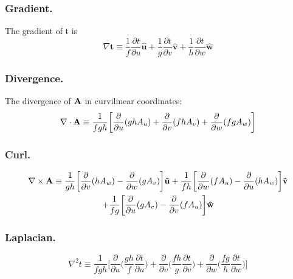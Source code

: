 \documentclass[../main.tex]{subfiles}
\begin{document}
\subsubsection{Gradient.} The gradient of t is
\begin{equation*}
    \nabla \mathbf{t} \equiv \frac{1}{f}\frac{\partial t}{\partial u}\mathbf{\hat{u}}+ \frac{1}{g}\frac{\partial t}{\partial v}\mathbf{\hat{v}}+ \frac{1}{h}\frac{\partial t}{\partial w}\mathbf{\hat{w}}
\end{equation*}

\subsubsection{Divergence.} The divergence of $\mathbf{A}$ in curvilinear coordinates:
\begin{equation*}
    \nabla \cdot \mathbf{A}\equiv \frac{1}{fgh} \biggl[ \frac{\partial}{\partial u} (ghA_u)+ \frac{\partial}{\partial v} (fh A_v)+\frac{\partial}{\partial w} (fg A_w)\biggr]
\end{equation*}

\subsubsection{Curl.} 
\begin{multline*}
    \nabla \times \mathbf{A}\equiv \frac{1}{gh} \biggl[\frac{\partial}{\partial v} (hA_w) -\frac{\partial}{\partial w } (g A_{v}) \biggr]\mathbf{\hat{u}}
    +\frac{1}{fh} \biggl[\frac{\partial}{\partial w} (f A_{u}) -\frac{\partial}{\partial u } (h A_{w}) \biggr]\mathbf{\hat{v}}\\
    +\frac{1}{fg} \biggl[\frac{\partial}{\partial u} (g A_{v}) -\frac{\partial}{\partial v } (f A_{u}) \biggr]\mathbf{\hat{w}}
\end{multline*}

\subsubsection{Laplacian.} 
\begin{equation*}
    \nabla^2t\equiv \frac{1}{fgh}\biggl[\frac{\partial}{\partial u}\Biggl(\frac{gh}{f}\frac{\partial t}{\partial u}\Biggr)+ \frac{\partial}{\partial v}\Biggl(\frac{fh}{g}\frac{\partial t}{\partial v} \Biggr)+ \frac{\partial}{\partial w}\Biggl(\frac{fg}{h}\frac{\partial t}{\partial w}\Biggr)\biggr]
\end{equation*}
\end{document}
